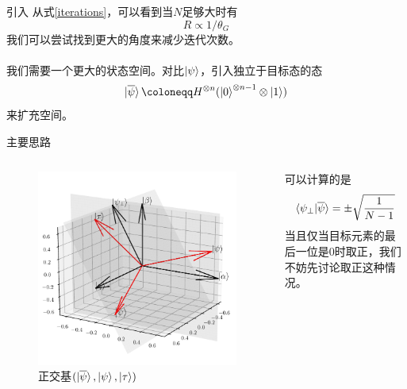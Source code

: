 \documentclass{beamer}
\begin{document}
\begin{frame}{引入}
    从式\ref{iterations}，可以看到当$N$足够大时有
    \begin{equation}
        R\propto 1/\theta_{G}
    \end{equation}
    我们可以尝试找到更大的角度来减少迭代次数。\\~\\

    我们需要一个更大的状态空间。对比$\ket{\psi}$，引入独立于目标态的态
    \begin{equation}
        \ket{\overline{\psi}}\coloneqq H^{\otimes n}(\ket{0}^{\otimes n-1}\otimes\ket{1})
    \end{equation}
    来扩充空间。
\end{frame}

\begin{frame}{主要思路}
    \begin{columns}
        \begin{figure}
            \centering
            \includegraphics[width=\linewidth]{pic/basic_3.pdf}
            \caption{正交基$(\ket{\overline{\psi}},\ket{\psi},\ket{\tau})$}
        \end{figure}
        可以计算的是
        \begin{equation}
            \braket{\psi_{\perp}|\overline{\psi}}=\pm\sqrt{\frac{1}{N-1}}
        \end{equation}
        当且仅当目标元素的最后一位是$0$时取正，我们不妨先讨论取正这种情况。
    \end{columns}
\end{frame}
\end{document}
